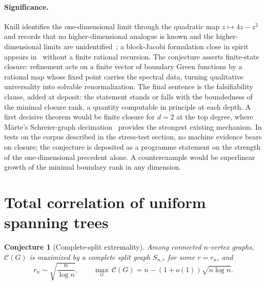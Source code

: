 \documentclass[11pt]{article}
\newtheorem{conjecture}{Conjecture}
\theoremstyle{definition}
\begin{document}
\paragraph{Significance.}
Knill identifies the one-dimensional limit through the quadratic map $z\mapsto4z-z^2$ and records that no higher-dimensional analogue is known and the higher-dimensional limits are unidentified~\cite{Kn15a}; a block-Jacobi formulation close in spirit appears in~\cite{Kn26} without a finite rational recursion.  The conjecture asserts finite-state closure: refinement acts on a finite vector of boundary Green functions by a rational map whose fixed point carries the spectral data, turning qualitative universality into solvable renormalization.  The final sentence is the falsifiability clause, added at deposit: the statement stands or falls with the boundedness of the minimal closure rank, a quantity computable in principle at each depth.  A first decisive theorem would be finite closure for $d=2$ at the top degree, where M\"arte's Schreier-graph decimation~\cite{Mar22} provides the strongest existing mechanism.  In tests on the corpus described in the stress-test section, no machine evidence bears on closure; the conjecture is deposited as a programme statement on the strength of the one-dimensional precedent alone.  A counterexample would be superlinear growth of the minimal boundary rank in any dimension.

\section{Total correlation of uniform spanning trees}

\begin{conjecture}[Complete-split extremality]\label{ac6}
Among connected $n$-vertex graphs, $\mathcal C(G)$ is maximized by a complete split graph $S_{n,r}$ for some $r=r_n$, and
\[
r_n\sim\sqrt{\frac n{\log n}},\qquad \max_G\,\mathcal C(G)=n-(1+o(1))\sqrt{n\log n}.
\]
\end{conjecture}
\end{document}
